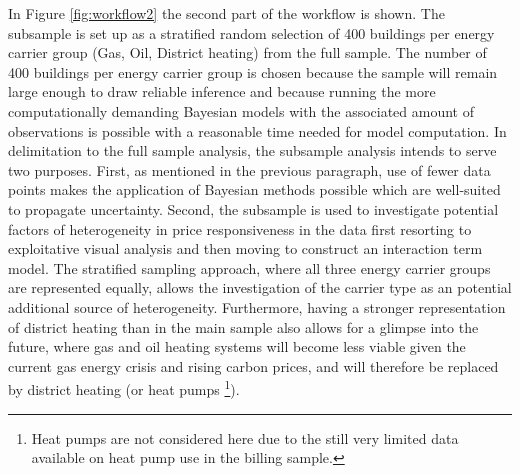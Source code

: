 \documentclass[12pt,twoside]{reedthesis}
\begin{document}
In Figure \ref{fig:workflow2} the second part of the workflow is shown. The subsample is set up as a stratified random selection of 400 buildings per energy carrier group (Gas, Oil, District heating) from the full sample. The number of 400 buildings per energy carrier group is chosen because the sample will remain large enough to draw reliable inference and because running the more computationally demanding Bayesian models with the associated amount of observations is possible with a reasonable time needed for model computation. In delimitation to the full sample analysis, the subsample analysis intends to serve two purposes. First, as mentioned in the previous paragraph, use of fewer data points makes the application of Bayesian methods possible which are well-suited to propagate uncertainty. Second, the subsample is used to investigate potential factors of heterogeneity in price responsiveness in the data first resorting to exploitative visual analysis and then moving to construct an interaction term model. The stratified sampling approach, where all three energy carrier groups are represented equally, allows the investigation of the carrier type as an potential additional source of heterogeneity. Furthermore, having a stronger representation of district heating than in the main sample also allows for a glimpse into the future, where gas and oil heating systems will become less viable given the current gas energy crisis and rising carbon prices, and will therefore be replaced by district heating (or heat pumps \footnote{Heat pumps are not considered here due to the still very limited data available on heat pump use in the billing sample.}).
\end{document}

